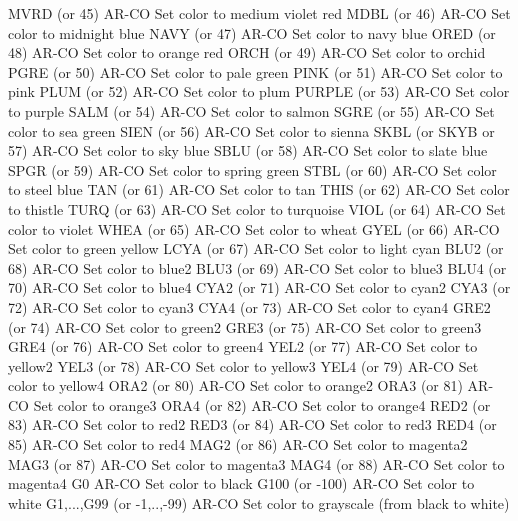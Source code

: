 MVRD    (or 45)             AR-CO Set color to medium violet red
MDBL    (or 46)             AR-CO Set color to midnight blue
NAVY    (or 47)             AR-CO Set color to navy blue
ORED    (or 48)             AR-CO Set color to orange red
ORCH    (or 49)             AR-CO Set color to orchid
PGRE    (or 50)             AR-CO Set color to pale green
PINK    (or 51)             AR-CO Set color to pink
PLUM    (or 52)             AR-CO Set color to plum 
PURPLE  (or 53)             AR-CO Set color to purple
SALM    (or 54)             AR-CO Set color to salmon
SGRE    (or 55)             AR-CO Set color to sea green
SIEN    (or 56)             AR-CO Set color to sienna
SKBL    (or SKYB or 57)     AR-CO Set color to sky blue
SBLU    (or 58)             AR-CO Set color to slate blue
SPGR    (or 59)             AR-CO Set color to spring green
STBL    (or 60)             AR-CO Set color to steel blue
TAN     (or 61)             AR-CO Set color to tan
THIS    (or 62)             AR-CO Set color to thistle
TURQ    (or 63)             AR-CO Set color to turquoise
VIOL    (or 64)             AR-CO Set color to violet
WHEA    (or 65)             AR-CO Set color to wheat
GYEL    (or 66)             AR-CO Set color to green yellow
LCYA    (or 67)             AR-CO Set color to light cyan
BLU2    (or 68)             AR-CO Set color to blue2
BLU3    (or 69)             AR-CO Set color to blue3
BLU4    (or 70)             AR-CO Set color to blue4
CYA2    (or 71)             AR-CO Set color to cyan2
CYA3    (or 72)             AR-CO Set color to cyan3
CYA4    (or 73)             AR-CO Set color to cyan4
GRE2    (or 74)             AR-CO Set color to green2
GRE3    (or 75)             AR-CO Set color to green3
GRE4    (or 76)             AR-CO Set color to green4
YEL2    (or 77)             AR-CO Set color to yellow2
YEL3    (or 78)             AR-CO Set color to yellow3
YEL4    (or 79)             AR-CO Set color to yellow4
ORA2    (or 80)             AR-CO Set color to orange2
ORA3    (or 81)             AR-CO Set color to orange3
ORA4    (or 82)             AR-CO Set color to orange4
RED2    (or 83)             AR-CO Set color to red2
RED3    (or 84)             AR-CO Set color to red3
RED4    (or 85)             AR-CO Set color to red4
MAG2    (or 86)             AR-CO Set color to magenta2
MAG3    (or 87)             AR-CO Set color to magenta3
MAG4    (or 88)             AR-CO Set color to magenta4
G0                          AR-CO Set color to black
G100    (or -100)           AR-CO Set color to white
G1,...,G99 (or -1,..,-99)   AR-CO Set color to grayscale (from black to white)

